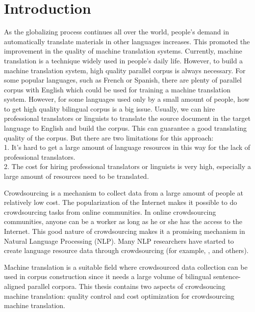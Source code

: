 \onehalfspaced
\setcounter{chapter}{0}
\chapter{Introduction}

As the globalizing process continues all over the world,  people's demand in automatically translate materials in other languages increases. This promoted the improvement in the quality of machine translation systems. Currently, machine translation is a technique widely used in people's daily life. However, to build a machine translation system, high quality parallel corpus is always necessary. For some popular languages, such as French or Spanish, there are plenty of parallel corpus with English which could be used for training a machine translation system. However, for some languages used only by a small amount of people, how to get high quality bilingual corpus is a big issue. Usually, we can hire professional translators or linguists to translate the source document in the target language to English and build the corpus. This can guarantee a good translating quality of the corpus. But there are two limitations for this approach: \\
1. It's hard to get a large amount of language resources in this way for the lack of professional translators. \\
2. The cost for hiring professional translators or linguists is very high, especially a large amount of resources need to be translated. 

Crowdsourcing is a mechanism to collect data from a large amount of people at relatively low cost. The popularization of the Internet makes it possible to do crowdsourcing  tasks from online communities. In online crowdsourcing communities, anyone can be a worker as long as he or she has the access to the Internet. This good nature of crowdsourcing makes it a promising mechanism in Natural Language Processing (NLP). Many NLP researchers have started to create language resource data through crowdsourcing (for example,  ,  and others). 

Machine translation is a suitable field where crowdsourced data collection can be used in corpus construction since it needs a large volume of bilingual sentence-aligned parallel corpora. This thesis contains two aspects of crowdsoucing machine translation: quality control  \cite{zaidan-callisonburch:2011:ACL-HLT2011a} and cost optimization for crowdsourcing machine translation. 

